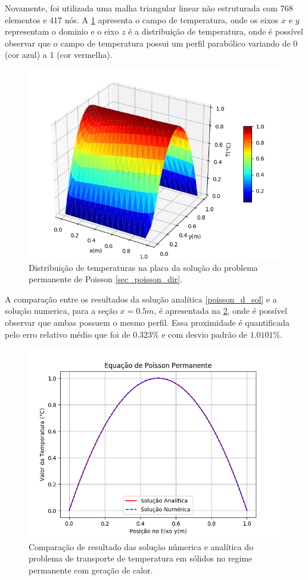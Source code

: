 Novamente, foi utilizada uma malha triangular linear não estruturada com 768 elementos e 417 nós.
A \ref{poisson_d_3d} apresenta o campo de temperatura, onde os eixos $x$ e $y$ representam o dominio e o eixo $z$ é a distribuição de temperatura, onde é possível observar que o campo de temperatura possui um perfil parabólico variando de 0 (cor azul) a 1 (cor vermelha).
\begin{figure}[H]
    \centering
    \includegraphics[width=.7\linewidth]{figures/poisson_dirichlet_permanent_3d.png}
    \caption{Distribuição de temperaturas na placa da solução do problema permanente de Poisson \ref{sec_poisson_dir}.}
    \label{poisson_d_3d}
\end{figure}

A comparação entre os resultados da solução analítica \eqref{poisson_d_sol} e a solução numerica, para a seção $x=0.5m$, é apresentada na \ref{poisson_d_perm_comp}, onde é possível observar que ambas possuem o mesmo perfil.
Essa proximidade é quantificada pelo erro relativo médio que foi de $0.323\%$ e com desvio padrão de $1.0101\%$.
\begin{figure}[H]
    \centering
    \includegraphics[width=.7\linewidth]{figures/poisson_dirichlet_permanent_comparison.png}
    \caption{Comparação de resultado das solução númerica e analítica do problema de transporte de temperatura em sólidos no regime permanente com geração de calor.}
    \label{poisson_d_perm_comp}
\end{figure}

